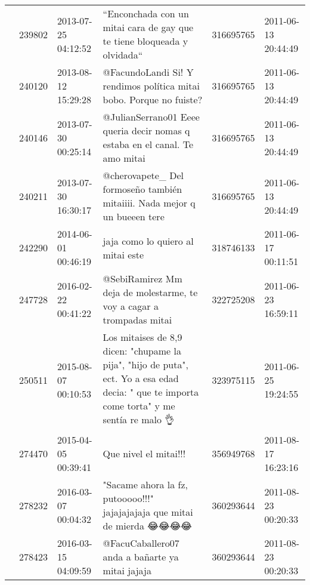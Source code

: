 \begin{tabular}{llllrl}
           & 239802  & 2013-07-25 04:12:52 &                                                                      “Enconchada con un mitai cara de gay que te tiene bloqueada y olvidada“ &   316695765 & 2011-06-13 20:44:49 \\
           & 240120  & 2013-08-12 15:29:28 &                                                                          @FacundoLandi Si! Y rendimos política mitai bobo. Porque no fuiste? &   316695765 & 2011-06-13 20:44:49 \\
           & 240146  & 2013-07-30 00:25:14 &                                                                  @JulianSerrano01 Eeee queria decir nomas q estaba en el canal. Te amo mitai &   316695765 & 2011-06-13 20:44:49 \\
           & 240211  & 2013-07-30 16:30:17 &                                                                    @cherovapete\_ Del formoseño también mitaiiii. Nada mejor q un bueeen tere &   316695765 & 2011-06-13 20:44:49 \\
           & 242290  & 2014-06-01 00:46:19 &                                                                                                            jaja como lo quiero al mitai este &   318746133 & 2011-06-17 00:11:51 \\
           & 247728  & 2016-02-22 00:41:22 &                                                                         @SebiRamirez Mm deja de molestarme, te voy a cagar a trompadas mitai &   322725208 & 2011-06-23 16:59:11 \\
           & 250511  & 2015-08-07 00:10:53 &   Los mitaises de 8,9 dicen: "chupame la pija", "hijo de puta", ect. Yo a esa edad decia: " que te importa come torta" y me sentía re malo 👌 &   323975115 & 2011-06-25 19:24:55 \\
           & 274470  & 2015-04-05 00:39:41 &                                                                                                                        Que nivel el mitai!!! &   356949768 & 2011-08-17 16:23:16 \\
           & 278232  & 2016-03-07 00:04:32 &                                                                     "Sacame ahora la fz, putooooo!!!"  jajajajajaja que mitai de mierda 😂😂😂😂 &   360293644 & 2011-08-23 00:20:33 \\
           & 278423  & 2016-03-15 04:09:59 &                                                                                              @FacuCaballero07 anda a bañarte ya mitai jajaja &   360293644 & 2011-08-23 00:20:33 \\

\end{tabular}
